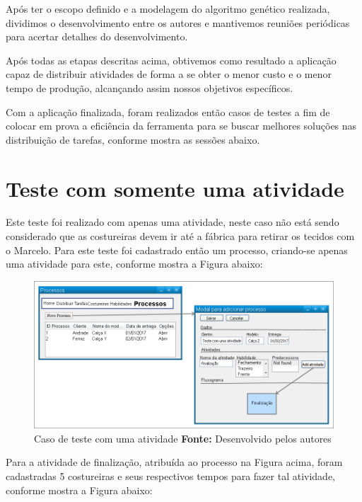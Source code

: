 \par Após ter o escopo definido e a modelagem do algoritmo genético realizada, dividimos o desenvolvimento entre os autores
e mantivemos reuniões periódicas para acertar detalhes do desenvolvimento.

\par Após todas as etapas descritas acima, obtivemos como resultado a aplicação capaz de distribuir atividades de forma a se obter o 
menor custo e o menor tempo de produção, alcançando assim nossos objetivos específicos. 

\par Com a aplicação finalizada, foram realizados então casos de testes a fim de colocar em prova a eficiência da ferramenta para se 
buscar melhores soluções nas distribuição de tarefas, conforme mostra as sessões abaixo.


\section{Teste com somente uma atividade}
\par Este teste foi realizado com apenas uma atividade, neste caso não está sendo considerado que as costureiras devem ir 
até a fábrica para retirar os tecidos com o Marcelo. Para este teste foi cadastrado então um processo, criando-se apenas uma atividade para 
este, conforme mostra a Figura abaixo:

\begin{figure}[h!]
	\centerline{\includegraphics[scale=0.4]{./imagens/test_case_1.png}}
	\caption[Caso de teste]
	{Caso de teste com uma atividade \textbf{Fonte:} Desenvolvido pelos autores}
	\label{fig:exemplo1}
\end{figure}

\par Para a atividade de finalização, atribuída ao processo na Figura acima, foram cadastradas 5 costureiras e seus respectivos
tempos para fazer tal atividade, conforme mostra a Figura abaixo:


